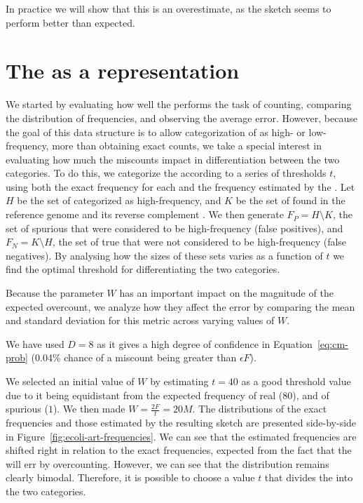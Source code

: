 In practice we will show that this is an overestimate, as the sketch seems to perform better than expected.


\section{The \dBCM as a \dBG representation}

We started by evaluating how well the \dBCM performs the task of \kmer counting, comparing the distribution of frequencies, and observing the average error. However, because the goal of this data structure is to allow categorization of  as high- or low-frequency, more than obtaining exact \kmer counts, we take a special interest in evaluating how much the miscounts impact in differentiation between the two categories. To do this, we categorize the  according to a series of thresholds $t$, using both the exact frequency for each \kmer and the frequency estimated by the \dBCM. Let $H$ be the set of  categorized as high-frequency, and $K$ be the set of  found in the reference genome  and its reverse complement . We then generate $F_P = H \setminus K$, the set of spurious  that were considered to be high-frequency (false positives), and $F_N = K \setminus H$, the set of true  that were not considered to be high-frequency (false negatives). By analysing how the sizes of these sets varies as a function of $t$ we find the optimal threshold for differentiating the two categories.

Because the parameter $W$ has an important impact on the magnitude of the expected overcount, we analyze how they affect the error by comparing the mean and standard deviation for this metric across varying values of $W$.

We have used $D = 8$ as it gives a high degree of confidence in Equation~\ref{eq:cm-prob} (0.04\% chance of a miscount being greater than $\epsilon F$).

We selected an initial value of $W$ by estimating $t = 40$ as a good threshold value due to it being equidistant from the expected frequency of real  ($80$), and of spurious  ($1$). We then made $W = \frac{2F}{t} = 20M$. The distributions of the exact frequencies and those estimated by the resulting \dBCM sketch are presented side-by-side in Figure~\ref{fig:ecoli-art-frequencies}. We can see that the estimated frequencies are shifted right in relation to the exact frequencies, expected from the fact that the \dBCM will err by overcounting. However, we can see that the distribution remains clearly bimodal. Therefore, it is possible to choose a value $t$ that divides the  into the two categories.

